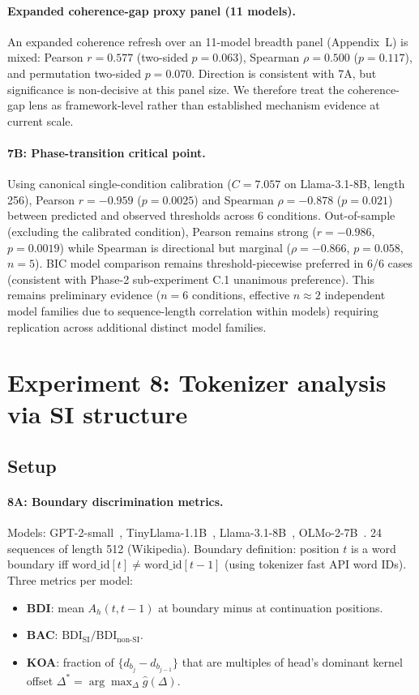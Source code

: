 \documentclass{article}
\begin{document}
\paragraph{Expanded coherence-gap proxy panel (11 models).}
An expanded coherence refresh over an 11-model breadth panel (Appendix~L) is mixed:
Pearson $r=0.577$ (two-sided $p=0.063$), Spearman $\rho=0.500$ ($p=0.117$), and
permutation two-sided $p=0.070$. Direction is consistent with 7A, but significance is
non-decisive at this panel size. We therefore treat the coherence-gap lens as
framework-level rather than established mechanism evidence at current scale.

\paragraph{7B: Phase-transition critical point.}

Using canonical single-condition calibration ($C=7.057$ on Llama-3.1-8B, length 256),
Pearson $r=-0.959$ ($p=0.0025$) and Spearman $\rho=-0.878$ ($p=0.021$) between predicted
and observed thresholds across 6 conditions. Out-of-sample (excluding the calibrated
condition), Pearson remains strong ($r=-0.986$, $p=0.0019$) while Spearman is directional
but marginal ($\rho=-0.866$, $p=0.058$, $n=5$). BIC model comparison remains threshold-piecewise
preferred in 6/6 cases (consistent with Phase-2 sub-experiment C.1 unanimous preference). This remains
preliminary evidence ($n=6$ conditions, effective $n \approx 2$ independent model families
due to sequence-length correlation within models) requiring replication across additional
distinct model families.

\section{Experiment 8: Tokenizer analysis via SI structure}
\label{app:exp8}

\subsection{Setup}

\paragraph{8A: Boundary discrimination metrics.} Models: GPT-2-small~\citep{radford2019language},
TinyLlama-1.1B~\citep{zhang2024tinyllama}, Llama-3.1-8B~\citep{dubey2024llama3},
OLMo-2-7B~\citep{groeneveld2024olmo}. 24 sequences of length 512 (Wikipedia). Boundary
definition: position $t$ is a word boundary iff $\text{word\_id}[t] \ne \text{word\_id}[t-1]$
(using tokenizer fast API word IDs). Three metrics per model:
\begin{itemize}
    \item \textbf{BDI}: mean $A_h(t, t{-}1)$ at boundary minus at continuation positions.
    \item \textbf{BAC}: $\text{BDI}_\text{SI} / \text{BDI}_\text{non-SI}$.
    \item \textbf{KOA}: fraction of $\{d_{b_j} - d_{b_{j-1}}\}$ that are multiples of
        head's dominant kernel offset $\Delta^* = \arg\max_\Delta \hat{g}(\Delta)$.
\end{itemize}
\end{document}

